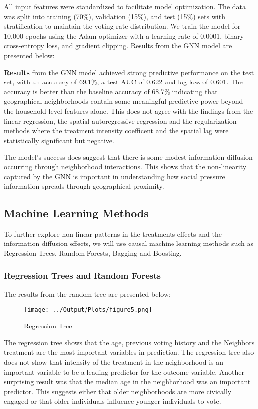 \documentclass[11pt]{article}
\begin{document}
All input features were standardized to facilitate model optimization. The data was split into training (70\%), validation (15\%), and test (15\%) sets with stratification to maintain the voting rate distribution. We train the model for 10,000 epochs using the Adam optimizer with a learning rate of 0.0001, binary cross-entropy loss, and gradient clipping. Results from the GNN model are presented below:

\textbf{Results} from the GNN model achieved strong predictive performance on the test set, with an accuracy of 69.1\%, a test AUC of 0.622 and log loss of 0.601. The accuracy is better than the baseline accuracy of 68.7\% indicating that geographical neighborhoods contain some meaningful predictive power beyond the household-level features alone. This does not agree with the findings from the linear regression, the spatial autoregressive regression and the regularization methods where the treatment intensity coefficent and the spatial lag were statistically significant but negative.

The model's success does suggest that there is some modest information diffusion occurring through neighborhood interactions. This shows that the non-linearity captured by the GNN is important in understanding how social pressure information spreads through geographical proximity.

\subsection{Machine Learning Methods}
To further explore non-linear patterns in the treatments effects and the information diffusion effects, we will use causal machine learning methods such as Regression Trees, Random Forests, Bagging and Boosting. 

\subsubsection{Regression Trees and Random Forests}
The results from the random tree are presented below:
\begin{figure}[H]
    \centering
    \texttt{[image: ../Output/Plots/figure5.png]}   
    \caption{Regression Tree}
    \label{fig:regression_tree}
\end{figure}
The regression tree shows that the age, previous voting history and the Neighbors treatment are the most important variables in prediction. The regression tree also does not show that intensity of the treatment in the neighborhood is an important variable to be a leading predictor for the outcome variable.  Another surprising result was that the median age in the neighborhood was an important predictor. This suggests either that older neighborhoods are more civically engaged or that older individuals influence younger individuals to vote.
\end{document}

